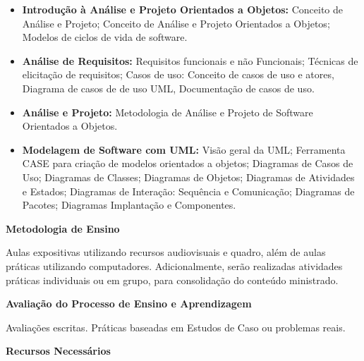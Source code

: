 \begin{itemize}

  \item \textbf{Introdução à Análise e Projeto Orientados a Objetos:} Conceito de Análise e Projeto; Conceito de Análise e Projeto Orientados a Objetos; Modelos de ciclos de vida de software.
 
  \item \textbf{Análise de Requisitos:} Requisitos funcionais e não Funcionais;	Técnicas de elicitação de requisitos; Casos de uso: Conceito de casos de uso e atores, Diagrama de casos de de uso UML, Documentação de casos de uso.
 
  \item \textbf{Análise e Projeto:} Metodologia de Análise e Projeto de Software Orientados a Objetos.
  
  \item \textbf{Modelagem de Software com UML:} Visão geral da UML; Ferramenta CASE para criação de modelos orientados a objetos; Diagramas de Casos de Uso; Diagramas de Classes; Diagramas de Objetos; Diagramas de Atividades e Estados;  Diagramas de Interação: Sequência e Comunicação; Diagramas de Pacotes; Diagramas Implantação e Componentes.

\end{itemize}


\begin{snugshade}\begin{center}\textbf{
    Metodologia de Ensino
}\end{center}\end{snugshade}

\noindent
   Aulas expositivas utilizando recursos audiovisuais e quadro, além de aulas práticas utilizando computadores. Adicionalmente, serão realizadas atividades práticas individuais ou em grupo, para consolidação do conteúdo ministrado.


\begin{snugshade}\begin{center}\textbf{
    Avaliação do Processo de Ensino e Aprendizagem
}\end{center}\end{snugshade}

\noindent
  Avaliações escritas. Práticas baseadas em Estudos de Caso ou problemas reais.


\begin{snugshade}\begin{center}\textbf{
    Recursos Necessários
    \vphantom{q} %
}\end{center}\end{snugshade}

